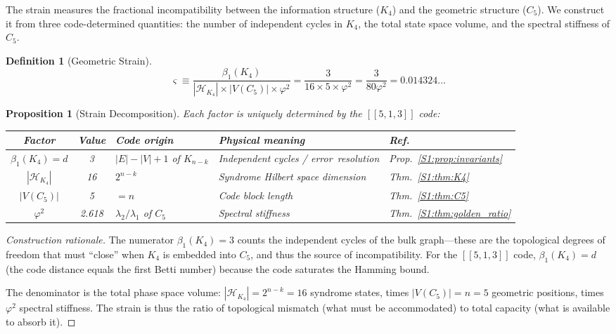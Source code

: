 \documentclass[11pt,a4paper]{article}
\newtheorem{proposition}[theorem]{Proposition}
\theoremstyle{definition}
\newtheorem{definition}[theorem]{Definition}
\newcommand{\gs}{\varsigma}
\begin{document}
The strain measures the fractional incompatibility between the information structure ($K_4$) and the geometric structure ($C_5$). We construct it from three code-determined quantities: the number of independent cycles in $K_4$, the total state space volume, and the spectral stiffness of $C_5$.

\begin{definition}[Geometric Strain]
\label{S1:def:strain}
\begin{equation}
\boxed{\gs \equiv \frac{\beta_1(K_4)}{|\mathcal{H}_{K_4}| \times |V(C_5)| \times \varphi^2} = \frac{3}{16 \times 5 \times \varphi^2} = \frac{3}{80\varphi^2} = 0.014324\ldots}
\label{S1:eq:strain}
\end{equation}
\end{definition}

\begin{proposition}[Strain Decomposition]
\label{S1:prop:strain_decomp}
Each factor is uniquely determined by the $[[5,1,3]]$ code:
\begin{center}
\renewcommand{\arraystretch}{1.5}
\begin{tabular}{cclp{3.9cm}l}
\toprule
\textbf{Factor} & \textbf{Value} & \textbf{Code origin} & \textbf{Physical meaning} & \textbf{Ref.} \\
\midrule
$\beta_1(K_4) = d$ & 3 & $|E|-|V|+1$ of $K_{n-k}$ & Independent cycles / \mbox{error~resolution} & Prop.~\ref{S1:prop:invariants} \\
$|\mathcal{H}_{K_4}|$ & 16 & $2^{n-k}$ & Syndrome Hilbert space dimension & Thm.~\ref{S1:thm:K4} \\
$|V(C_5)|$ & 5 & $= n$ & Code block length & Thm.~\ref{S1:thm:C5} \\
$\varphi^2$ & 2.618 & $\lambda_2/\lambda_1$ of $C_5$ & Spectral stiffness & Thm.~\ref{S1:thm:golden_ratio} \\
\bottomrule
\end{tabular}
\renewcommand{\arraystretch}{1.0}
\end{center}
\end{proposition}

\begin{proof}[Construction rationale]
The numerator $\beta_1(K_4) = 3$ counts the independent cycles of the bulk graph---these are the topological degrees of freedom that must ``close'' when $K_4$ is embedded into $C_5$, and thus the source of incompatibility. For the $[[5,1,3]]$ code, $\beta_1(K_4) = d$ (the code distance equals the first Betti number) because the code saturates the Hamming bound.

The denominator is the total phase space volume: $|\mathcal{H}_{K_4}| = 2^{n-k} = 16$ syndrome states, times $|V(C_5)| = n = 5$ geometric positions, times $\varphi^2$ spectral stiffness. The strain is thus the ratio of topological mismatch (what must be accommodated) to total capacity (what is available to absorb it).
\end{proof}
\end{document}
